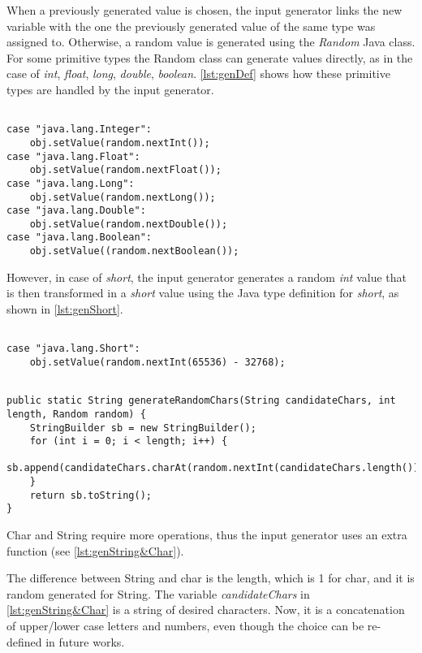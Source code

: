 When a previously generated value is chosen, the input generator links the new variable with the one the previously generated value of the same type was assigned to. Otherwise, a random value is generated using the \textit{Random} Java class. For some primitive types the Random class can generate values directly, as in the case of \textit{int}, \textit{float}, \textit{long}, \textit{double}, \textit{boolean}. \autoref{lst:genDef} shows how these primitive types are handled by the input generator. 

\begin{lstlisting}[caption={Random default generator},label={lst:genDef}]% Start your code-block

case "java.lang.Integer":
	obj.setValue(random.nextInt());
case "java.lang.Float":
	obj.setValue(random.nextFloat());
case "java.lang.Long":
	obj.setValue(random.nextLong());
case "java.lang.Double":
	obj.setValue(random.nextDouble());
case "java.lang.Boolean":
	obj.setValue((random.nextBoolean());
\end{lstlisting}

However, in case of \textit{short}, the input generator generates a random \textit{int} value that is then transformed in a \textit{short} value using the Java type definition for \textit{short}, as shown in \autoref{lst:genShort}.

\begin{lstlisting}[caption={Random short generator},label={lst:genShort}]% Start your code-block
	
case "java.lang.Short":
	obj.setValue(random.nextInt(65536) - 32768);
\end{lstlisting}

\begin{lstlisting}[caption={Random String/char generator},label={lst:genString&Char}]% Start your code-block

public static String generateRandomChars(String candidateChars, int length, Random random) {
	StringBuilder sb = new StringBuilder();
	for (int i = 0; i < length; i++) {
		sb.append(candidateChars.charAt(random.nextInt(candidateChars.length())));
	}
	return sb.toString();
}
\end{lstlisting}

Char and String require more operations, thus the input generator uses an extra function (see \autoref{lst:genString&Char}).

The difference between String and char is the length, which is 1 for char, and it is random generated for String. The variable \emph{candidateChars} in \autoref{lst:genString&Char} is a string of desired characters. Now, it is a concatenation of upper/lower case letters and numbers, even though the choice can be re-defined in future works. 

